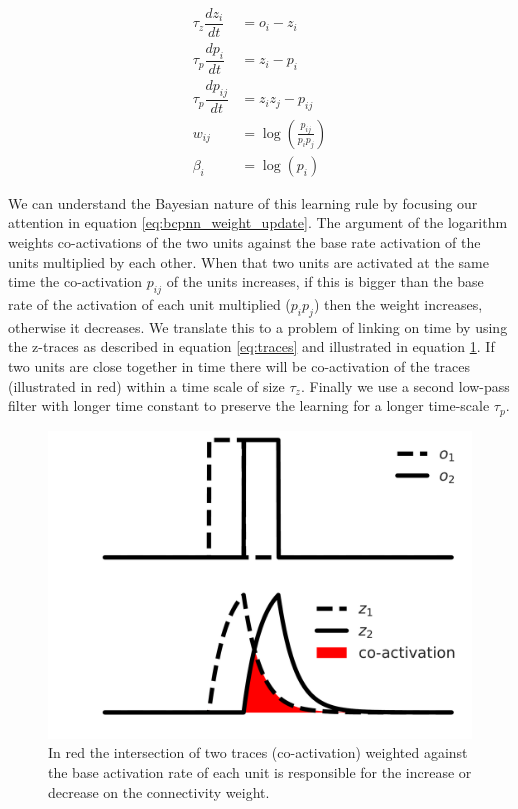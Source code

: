 \documentclass[10pt,a4paper]{article}
\begin{document}
\begin{align}
\tau_z \dfrac{dz_i}{dt} &= o_i - z_i \label{eq:traces}\\
\tau_p \dfrac{dp_i}{dt} &= z_i - p_i  \label{eq:traces_probability} \\  
\tau_p \dfrac{dp_{ij}}{dt} &= z_i z_j - p_{ij} \\
w_{ij} &= \log(\frac{p_{ij}}{p_i p_j}) \label{eq:bcpnn_weight_update} \\
\beta_i &= \log(p_i) 
\end{align}

We can understand the Bayesian nature of this learning rule by focusing our attention in equation \ref{eq:bcpnn_weight_update}. The argument of the logarithm weights co-activations of the two units against the base rate activation of the units multiplied by each other. When that two units are activated at the same time the co-activation $p_{ij}$ of the units increases, if this is bigger than the  base rate of the activation of each unit multiplied ($p_i p_j$) then the weight increases, otherwise it decreases. We translate this to a problem of linking on time by using the z-traces as described in equation \ref{eq:traces} and illustrated in equation \ref{fig:traces_example}. If two units are close together in time there will be co-activation of the traces (illustrated in red) within a time scale of size $\tau_z$. Finally  we use a second low-pass filter  with longer time constant to preserve the learning for a longer time-scale $\tau_p$. 

\begin{figure}[H]
\centering
\includegraphics[scale=0.30]{traces_example.pdf}
\caption{In red the intersection of two traces (co-activation) weighted against the base activation rate of each unit is responsible for the increase or decrease on the connectivity weight.}
\label{fig:traces_example}
\end{figure}
\end{document}
